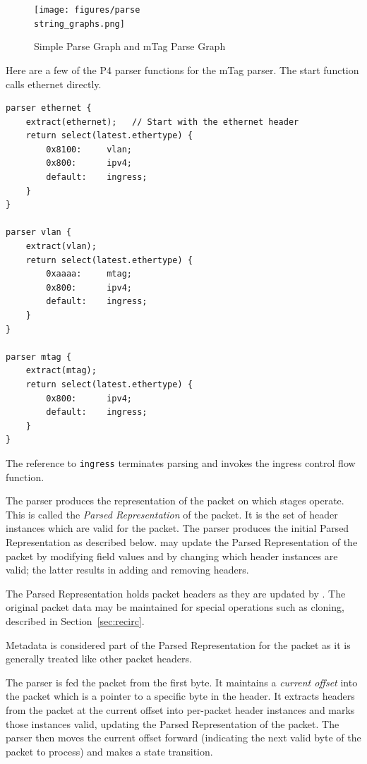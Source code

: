 \documentclass[12pt]{article}
\begin{document}
\begin{figure}[h!]
    \centering
    \texttt{[image: figures/parse\\string\_graphs.png]}
    \caption{Simple Parse Graph and mTag Parse Graph}
    \label{fig:parsegraphs}
\end{figure}


Here are a few of the P4 parser functions for the mTag parser. The 
start function calls ethernet directly.

\begin{lstlisting}[keywords={},frame=single,escapechar=\@]
parser ethernet {
    extract(ethernet);   // Start with the ethernet header
    return select(latest.ethertype) {
        0x8100:     vlan;
        0x800:      ipv4;
        default:    ingress;
    }
}

parser vlan {
    extract(vlan);
    return select(latest.ethertype) {
        0xaaaa:     mtag;
        0x800:      ipv4;
        default:    ingress;
    }
}

parser mtag {
    extract(mtag);
    return select(latest.ethertype) {
        0x800:      ipv4;
        default:    ingress;
    }
}
\end{lstlisting}


The reference to \texttt{ingress} terminates parsing and invokes the ingress control 
flow function.


The parser produces the representation of the packet on which \matchaction 
stages operate. This is called the \textit{Parsed Representation} of the packet. 
It is the set of header instances which are valid for the packet. The parser 
produces the initial Parsed Representation as described below. \Matchaction 
may update the Parsed Representation of the packet by modifying field values 
and by changing which header instances are valid; the latter results in adding 
and removing headers. 

The Parsed Representation holds packet headers as they are updated by \matchaction. 
The original packet data may be maintained for special operations such as 
cloning, described in Section~\ref{sec:recirc}.

Metadata is considered part of the Parsed Representation for the packet as 
it is generally treated like other packet headers.


The parser is fed the packet from the first byte. It maintains a \textit{current 
offset} into the packet which is a pointer to a specific byte in the header. It 
extracts headers from the packet at the current offset into per-packet header 
instances and marks those instances valid, updating the Parsed Representation 
of the packet. The parser then moves the current offset forward (indicating 
the next valid byte of the packet to process) and makes a state transition.
\end{document}
